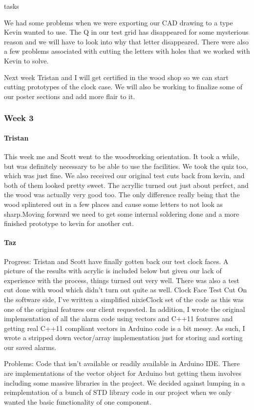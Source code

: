 tasks\documentclass[onecolumn, draftclsnofoot,10pt, compsoc]{IEEEtran}
\begin{document}
We had some problems when we were exporting our CAD drawing to a type Kevin wanted to use. The Q in our test grid has disappeared for some mysterious reason and we will have to look into why that letter disappeared. There were also a few problems associated with cutting the letters with holes that we worked with Kevin to solve.

Next week Tristan and I will get certified in the wood shop so we can start cutting prototypes of the clock case. We will also be working to finalize some of our poster sections and add more flair to it.
\subsubsection{Week 3}
\paragraph{Tristan}
This week me and Scott went to the woodworking orientation. It took a while, but was definitely necessary to be able to use the facilities. We took the quiz too, which was just fine. We also received our original test cuts back from kevin, and both of them looked pretty sweet. The acryllic turned out just about perfect, and the wood was actually very good too. The only difference really being that the wood splintered out in a few places and cause some letters to not look as sharp.Moving forward we need to get some internal soldering done and a more finished prototype to kevin for another cut.

\paragraph{Taz}
Progress: Tristan and Scott have finally gotten back our test clock faces. A picture of the results with acrylic is included below but given our lack of experience with the process, things turned out very well. There was also a test cut done with wood which didn't turn out quite as well. Clock Face Test Cut On the software side, I've written a simplified nixieClock set of the code as this was one of the original features our client requested. In addition, I wrote the original implementation of all the alarm code using vectors and C++11 features and getting real C++11 compliant vectors in Arduino code is a bit messy. As such, I wrote a stripped down vector/array implementation just for storing and sorting our saved alarms.

Problems: Code that isn't available or readily available in Arduino IDE. There are implementations of the vector object for Arduino but getting them involves including some massive libraries in the project. We decided against lumping in a reimplemtation of a bunch of STD library code in our project when we only wanted the basic functionality of one component.
\end{document}
